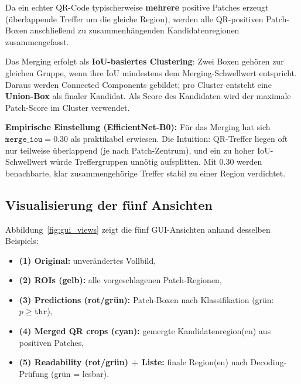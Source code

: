 Da ein echter \ac{QR}-Code typischerweise \textbf{mehrere} positive Patches erzeugt (überlappende Treffer um die gleiche Region), werden alle \ac{QR}-positiven Patch-Boxen anschließend zu zusammenhängenden Kandidatenregionen zusammengefasst.

Das Merging erfolgt als \textbf{\ac{IoU}-basiertes Clustering}: Zwei Boxen gehören zur gleichen Gruppe, wenn ihre \ac{IoU} mindestens dem Merging-Schwellwert entspricht. Daraus werden Connected Components gebildet; pro Cluster entsteht eine \textbf{Union-Box} als finaler Kandidat. Als Score des Kandidaten wird der maximale Patch-Score im Cluster verwendet.

\textbf{Empirische Einstellung (EfficientNet-B0):} Für das Merging hat sich $\texttt{merge\_iou}=0.30$ als praktikabel erwiesen. Die Intuition: \ac{QR}-Treffer liegen oft nur teilweise überlappend (je nach Patch-Zentrum), und ein zu hoher \ac{IoU}-Schwellwert würde Treffergruppen unnötig aufsplitten. Mit $0.30$ werden benachbarte, klar zusammengehörige Treffer stabil zu einer Region verdichtet.

\subsection{Visualisierung der fünf Ansichten}
\label{subsec:views}

Abbildung~\ref{fig:gui_views} zeigt die fünf \ac{GUI}-Ansichten anhand desselben Beispiels:
\begin{itemize}
    \item \textbf{(1) Original:} unverändertes Vollbild,
    \item \textbf{(2) \ac{ROI}s (gelb):} alle vorgeschlagenen Patch-Regionen,
    \item \textbf{(3) Predictions (rot/grün):} Patch-Boxen nach Klassifikation (grün: $p\ge\texttt{thr}$),
    \item \textbf{(4) Merged \ac{QR} crops (cyan):} gemergte Kandidatenregion(en) aus positiven Patches,
    \item \textbf{(5) Readability (rot/grün) + Liste:} finale Region(en) nach Decoding-Prüfung (grün = lesbar).
\end{itemize}

